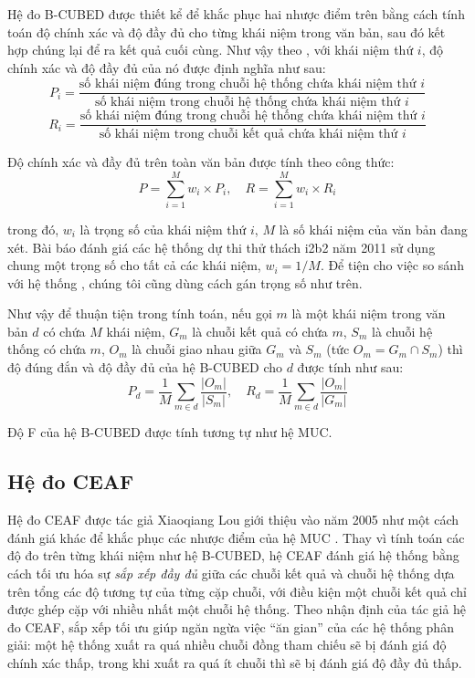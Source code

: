 Hệ đo B-CUBED được thiết kể để khắc phục hai nhược điểm trên bằng cách tính toán độ chính xác và độ đầy đủ cho từng khái niệm trong văn bản, sau đó kết hợp chúng lại để ra kết quả cuối cùng. Như vậy theo \cite{AmitBagga1998}, với khái niệm thứ $i$, độ chính xác và độ đầy đủ của nó được định nghĩa như sau:
\[P_i=\frac{\text{số khái niệm đúng trong chuỗi hệ thống chứa khái niệm thứ $i$}}{\text{số khái niệm trong chuỗi hệ thống chứa khái niệm thứ $i$}}\]
\[R_i=\frac{\text{số khái niệm đúng trong chuỗi hệ thống chứa khái niệm thứ $i$}}{\text{số khái niệm trong chuỗi kết quả chứa khái niệm thứ $i$}}\]

Độ chính xác và đầy đủ trên toàn văn bản được tính theo công thức:
\[P=\sum_{i=1}^{M} w_i \times P_i,\quad R=\sum_{i=1}^{M} w_i\times R_i\]

\noindent trong đó, $w_i$ là trọng số của khái niệm thứ $i$, $M$ là số khái niệm của văn bản đang xét. Bài báo đánh giá các hệ thống dự thi thử thách i2b2 năm 2011 sử dụng chung một trọng số cho tất cả các khái niệm, $w_i=1/M$. Để tiện cho việc so sánh với hệ thống \cite{YanXu2012}, chúng tôi cũng dùng cách gán trọng số như trên.

Như vậy để thuận tiện trong tính toán, nếu gọi $m$ là một khái niệm trong văn bản $d$ có chứa $M$ khái niệm, $G_m$ là chuỗi kết quả có chứa $m$, $S_m$ là chuỗi hệ thống có chứa $m$, $O_m$ là chuỗi giao nhau giữa $G_m$ và $S_m$ (tức $O_m=G_m\cap S_m$) thì độ đúng đắn và độ đầy đủ của hệ B-CUBED cho $d$ được tính như sau:
\[P_d=\frac{1}{M}\sum_{m\in d}\frac{|O_m|}{|S_m|},\quad R_d=\frac{1}{M}\sum_{m\in d}\frac{|O_m|}{|G_m|}\]

Độ F của hệ B-CUBED được tính tương tự như hệ MUC.

\subsection*{Hệ đo CEAF}
Hệ đo CEAF được tác giả Xiaoqiang Lou giới thiệu vào năm 2005 như một cách đánh giá khác để khắc phục các nhược điểm của hệ MUC \cite{XiaoquangLuo2005}. Thay vì tính toán các độ đo trên từng khái niệm như hệ B-CUBED, hệ CEAF đánh giá hệ thống bằng cách tối ưu hóa sự \emph{sắp xếp đầy đủ} giữa các chuỗi kết quả và chuỗi hệ thống dựa trên tổng các độ tương tự của từng cặp chuỗi, với điều kiện một chuỗi kết quả chỉ được ghép cặp với nhiều nhất một chuỗi hệ thống. Theo nhận định của tác giả hệ đo CEAF, sắp xếp tối ưu giúp ngăn ngừa việc ``ăn gian'' của các hệ thống phân giải: một hệ thống xuất ra quá nhiều chuỗi đồng tham chiếu sẽ bị đánh giá độ chính xác thấp, trong khi xuất ra quá ít chuỗi thì sẽ bị đánh giá độ đầy đủ thấp.

